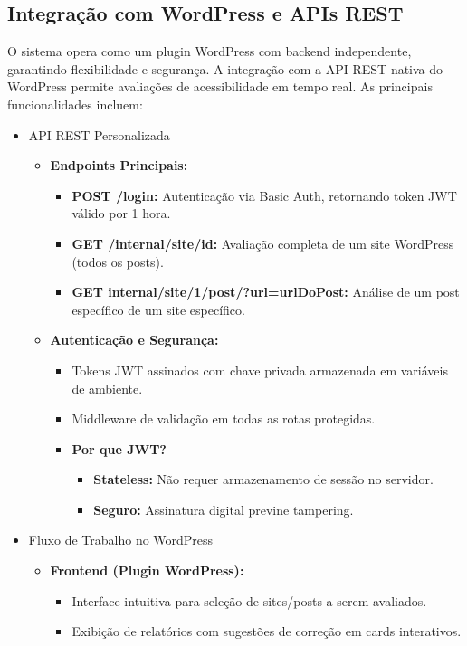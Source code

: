 \documentclass[12pt]{article}
\begin{document}
\subsection{Integração com WordPress e APIs REST}\label{subsec:api}
O sistema opera como um plugin WordPress com backend independente, garantindo
flexibilidade e segurança. A integração com a API REST nativa do WordPress permite
avaliações de acessibilidade em tempo real. As principais funcionalidades incluem:

\begin{itemize}
\item API REST Personalizada
\begin{itemize}
    \item \textbf{Endpoints Principais:}
    \begin{itemize}
        \item \textbf{POST /login: }Autenticação via Basic Auth, retornando token JWT válido
        por 1 hora.
        \item \textbf{GET /internal/site/{id}: }Avaliação completa de um site
        WordPress (todos os posts).
        \item \textbf{GET internal/site/1/post/?url={urlDoPost}: } Análise de um
        post específico de um site específico.
    \end{itemize}
    \item \textbf{Autenticação e Segurança:}
    \begin{itemize}
        \item Tokens JWT assinados com chave privada armazenada em variáveis de
        ambiente.
        \item Middleware de validação em todas as rotas protegidas.
        \item \textbf{Por que JWT?}
        \begin{itemize}
            \item \textbf{Stateless:} Não requer armazenamento de sessão no servidor.
            \item \textbf{Seguro:} Assinatura digital previne tampering.
        \end{itemize}
    \end{itemize}
\end{itemize}
\item Fluxo de Trabalho no WordPress
\begin{itemize}
    \item \textbf{Frontend (Plugin WordPress):}
    \begin{itemize}
        \item Interface intuitiva para seleção de sites/posts a serem avaliados.
        \item Exibição de relatórios com sugestões de correção em cards interativos.
    \end{itemize}
\end{itemize}

\end{itemize}

\nocite{*}
\printbibliography[title={Referências}]
\end{document}
